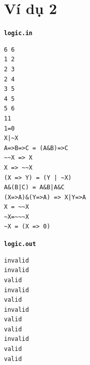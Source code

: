 \documentclass[11pt]{article}
\begin{document}
\section*{Ví dụ 2}

\noindent\begin{minipage}[t]{0.48\linewidth}
\textbf{\texttt{logic.in}}
\begin{verbatim}
6 6
1 2
2 3
2 4
3 5
4 5
5 6
11
1=0
X|~X
A=>B=>C = (A&B)=>C
~~X => X
X => ~~X
(X => Y) = (Y | ~X)
A&(B|C) = A&B|A&C
(X=>A)&(Y=>A) => X|Y=>A
X = ~~X
~X=~~~X
~X = (X => 0)
\end{verbatim}
\end{minipage}\hfill
\begin{minipage}[t]{0.45\linewidth}
\textbf{\texttt{logic.out}}
\begin{verbatim}
invalid
invalid
valid
invalid
valid
invalid
valid
valid
invalid
valid
valid
\end{verbatim}
\end{minipage}
\end{document}
